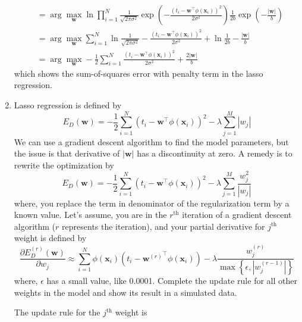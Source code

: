 \documentclass{article}
\begin{document}
\begin{enumerate}
\begin{sol}
\begin{align*}
            &= \arg\max_{\mathbf{w}} \ln \prod_{i=1}^N \frac{1}{\sqrt{2\pi\sigma^2}} \exp\left(-\frac{(t_i - \mathbf{w}^\top\phi(\mathbf{x}_i))^2}{2\sigma^2}\right) \frac{1}{2b} \exp\left(-\frac{|\mathbf{w}|}{b}\right)\\
            &= \arg\max_{\mathbf{w}} \sum_{i=1}^N \ln \frac{1}{\sqrt{2\pi\sigma^2}} -\frac{(t_i - \mathbf{w}^\top\phi(\mathbf{x}_i))^2}{2\sigma^2} + \ln \frac{1}{2b} -\frac{|\mathbf{w}|}{b}\\
            &= \arg\max_{\mathbf{w}} -\frac{1}{2}\sum_{i=1}^N \frac{(t_i - \mathbf{w}^\top\phi(\mathbf{x}_i))^2}{2\sigma^2} +\frac{2|\mathbf{w}|}{b}
        \end{align*}
        which shows the sum-of-squares error with penalty term in the lasso regression.
        \end{sol}
    \color{black}
    \item Lasso regression is defined by
    \begin{equation}
        E_D(\mathbf{w}) = -\frac{1}{2}\sum_{i=1}^N (t_i - \mathbf{w}^\top\phi(\mathbf{x}_i))^2 - \lambda\sum_{j=1}^M |w_j|
    \end{equation}
    We can use a gradient descent algorithm to find the model parameters, but the issue is that derivative of $|\mathbf{w}|$ has a discontinuity at zero. A remedy is to rewrite the optimization by
    \begin{equation}
        E_D(\mathbf{w}) = -\frac{1}{2}\sum_{i=1}^N (t_i - \mathbf{w}^\top\phi(\mathbf{x}_i))^2 - \lambda\sum_{j=1}^M \frac{w_j^2}{|w_j|}
    \end{equation}
    where, you replace the term in denominator of the regularization term by a known value. Let’s assume, you are in the $r^{\text{th}}$ iteration of a gradient descent algorithm ($r$ represents the iteration), and your partial 
    derivative for $j^{\text{th}}$ weight is defined by 
    \begin{equation}
        \dfrac{\partial E_D^{(r)}(\mathbf{w})}{\partial w_j} \approx \sum_{i=1}^{N} \phi(\mathbf{x}_i)\left(t_i - {\mathbf{w}^{(r)}}^\top \phi(\mathbf{x}_i)\right) - \lambda \frac{w_j^{(r)}}{\max \left\{\epsilon, |w_j^{(r-1)}|\right\}}
    \end{equation}
    where, $\epsilon$ has a small value, like 0.0001. Complete the update rule for all other weights in the model and show its result in a simulated data.  
    \color{blue}
    \begin{sol}
    The update rule for the $j^{\text{th}}$ weight is
    \begin{equation}

\end{equation}
\end{sol}
\end{enumerate}
\end{document}
